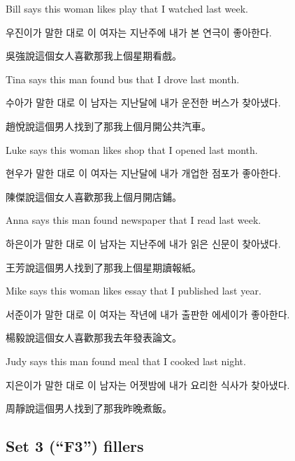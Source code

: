 \pex %
\a[label=E] \ljudge{*}Bill says this woman likes play that I watched last week.\par\nobreak
\a[label=K] \ljudge{*}\ko 우진이가 말한 대로 이 여자는 지난주에 내가 본 연극이 좋아한다\normalfont.\par\nobreak
\a[label=M] \ljudge{*}\zh 吳強說這個女人喜歡那我上個星期看戲。\normalfont
\xe

\pex %
\a[label=E] \ljudge{*}Tina says this man found bus that I drove last month.\par\nobreak
\a[label=K] \ljudge{*}\ko 수아가 말한 대로 이 남자는 지난달에 내가 운전한 버스가 찾아냈다\normalfont.\par\nobreak
\a[label=M] \ljudge{*}\zh 趙悅說這個男人找到了那我上個月開公共汽車。\normalfont
\xe

\pex %
\a[label=E] \ljudge{*}Luke says this woman likes shop that I opened last month.\par\nobreak
\a[label=K] \ljudge{*}\ko 현우가 말한 대로 이 여자는 지난달에 내가 개업한 점포가 좋아한다\normalfont.\par\nobreak
\a[label=M] \ljudge{*}\zh 陳傑說這個女人喜歡那我上個月開店鋪。\normalfont
\xe

\pex %
\a[label=E] \ljudge{*}Anna says this man found newspaper that I read last week.\par\nobreak
\a[label=K] \ljudge{*}\ko 하은이가 말한 대로 이 남자는 지난주에 내가 읽은 신문이 찾아냈다\normalfont.\par\nobreak
\a[label=M] \ljudge{*}\zh 王芳說這個男人找到了那我上個星期讀報紙。\normalfont
\xe

\pex %
\a[label=E] \ljudge{*}Mike says this woman likes essay that I published last year.\par\nobreak
\a[label=K] \ljudge{*}\ko 서준이가 말한 대로 이 여자는 작년에 내가 출판한 에세이가 좋아한다\normalfont.\par\nobreak
\a[label=M] \ljudge{*}\zh 楊毅說這個女人喜歡那我去年發表論文。\normalfont
\xe

\pex %
\a[label=E] \ljudge{*}Judy says this man found meal that I cooked last night.\par\nobreak
\a[label=K] \ljudge{*}\ko 지은이가 말한 대로 이 남자는 어젯밤에 내가 요리한 식사가 찾아냈다\normalfont.\par\nobreak
\a[label=M] \ljudge{*}\zh 周靜說這個男人找到了那我昨晚煮飯。\normalfont
\xe

\subsection{Set 3 (``F3'') fillers}

